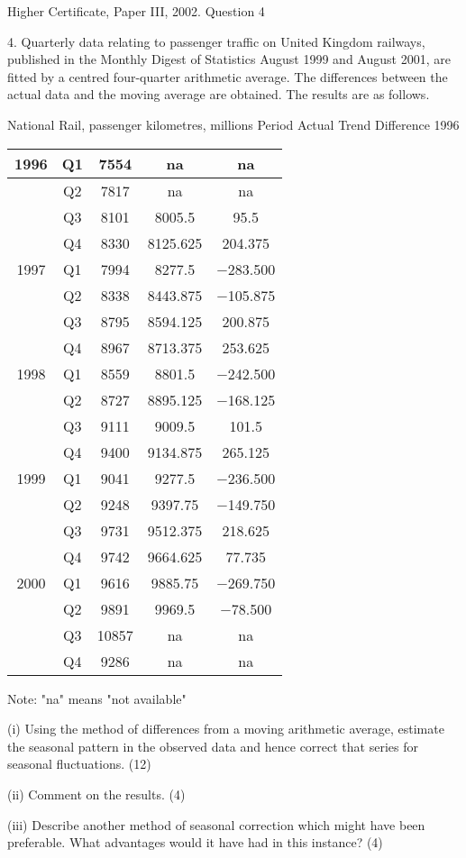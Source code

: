 \documentclass[a4paper,12pt]{article}
\begin{document}
Higher Certificate, Paper III, 2002. Question 4

\begin{framed}
4. 
Quarterly data relating to passenger traffic on United Kingdom railways, published in the Monthly Digest of 
Statistics August 1999 and August 2001, are fitted by a centred four-quarter arithmetic average.  
The differences between the actual data and the moving average are obtained.  The results are as follows. 
 
  National Rail, passenger kilometres, millions Period  Actual Trend Difference 1996 

\begin{center}
\begin{tabular}{|c|c|c|c|c|}
1996	&	Q1	&	7554	&	na	&	na	\\ \hline
	&	Q2	&	7817	&	na	&	na	\\ \hline
	&	Q3	&	8101	&	8005.5	&	95.5	\\ \hline
	&	Q4	&	8330	&	8125.625	&	204.375	\\ \hline \hline
1997	&	Q1	&	7994	&	8277.5	&	−283.500	\\ \hline
	&	Q2	&	8338	&	8443.875	&	−105.875	\\ \hline
	&	Q3	&	8795	&	8594.125	&	200.875	\\ \hline
	&	Q4	&	8967	&	8713.375	&	253.625	\\ \hline \hline
1998	&	Q1	&	8559	&	8801.5	&	−242.500	\\ \hline
	&	Q2	&	8727	&	8895.125	&	−168.125	\\ \hline
	&	Q3	&	9111	&	9009.5	&	101.5	\\ \hline
	&	Q4	&	9400	&	9134.875	&	265.125	\\ \hline \hline 
1999	&	Q1	&	9041	&	9277.5	&	−236.500	\\ \hline
	&	Q2	&	9248	&	9397.75	&	−149.750	\\ \hline
	&	Q3	&	9731	&	9512.375	&	218.625	\\ \hline
	&	Q4	&	9742	&	9664.625	&	77.735	\\ \hline \hline
2000	&	Q1	&	9616	&	9885.75	&	−269.750	\\ \hline
	&	Q2	&	9891	&	9969.5	&	−78.500	\\ \hline
	&	Q3	&	10857	&	na	&	na	\\ \hline
	&	Q4	&	9286	&	na	&	na	\\ \hline
\end{tabular}
\end{center}
 
     Note:  "na" means "not available" 
 
 
(i) Using the method of differences from a moving arithmetic average, estimate the seasonal pattern in the observed data and hence correct that series for seasonal fluctuations. (12) 
 
(ii) Comment on the results. 
(4) 
 
(iii) Describe another method of seasonal correction which might have been preferable.  What advantages would it have had in this instance? (4) 
 
\end{framed}
\end{document}
